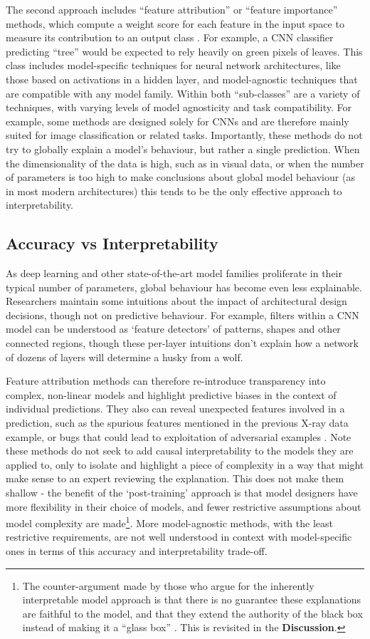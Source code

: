 \documentclass[main]{subfiles}
\begin{document}
The second approach includes ``feature attribution'' or ``feature importance'' methods, which compute a weight score for each feature in the input space to measure its contribution to an output class . For example, a CNN classifier predicting ``tree'' would be expected to rely heavily on green pixels of leaves. This class includes model-specific techniques for neural network architectures, like those based on activations in a hidden layer, and model-agnostic techniques that are compatible with any model family. Within both ``sub-classes'' are a variety of techniques, with varying levels of model agnosticity and task compatibility. For example, some methods are designed solely for CNNs and are therefore mainly suited for image classification or related tasks. Importantly, these methods do not try to globally explain a model's behaviour, but rather a single prediction. When the dimensionality of the data is high, such as in visual data, or when the number of parameters is too high to make conclusions about global model behaviour (as in most modern architectures) this tends to be the only effective approach to interpretability. 

\subsection*{Accuracy vs Interpretability}

As deep learning and other state-of-the-art model families proliferate in their typical number of parameters, global behaviour has become even less explainable. Researchers maintain some intuitions about the impact of architectural design decisions, though not on predictive behaviour. For example, filters within a CNN model can be understood as `feature detectors' of patterns, shapes and other connected regions, though these per-layer intuitions don't explain how a network of dozens of layers will determine a husky from a wolf.

Feature attribution methods can therefore re-introduce transparency into complex, non-linear models and highlight predictive biases in the context of individual predictions. They also can reveal unexpected features involved in a prediction, such as the spurious features mentioned in the previous X-ray data example, or bugs that could lead to exploitation of adversarial examples \cite{adversary}. Note these methods do not seek to add causal interpretability to the models they are applied to, only to isolate and highlight a piece of complexity in a way that might make sense to an expert reviewing the explanation. This does not make them shallow - the benefit of the `post-training' approach is that model designers have more flexibility in their choice of models, and fewer restrictive assumptions about model complexity are made\footnote{The counter-argument made by those who argue for the inherently interpretable model approach is that there is no guarantee these explanations are faithful to the model, and that they extend the authority of the black box instead of making it a ``glass box'' \cite{rudin}. This is revisited in the \textbf{Discussion}.}. More model-agnostic methods, with the least restrictive requirements, are not well understood in context with model-specific ones in terms of this accuracy and interpretability trade-off.
\end{document}
